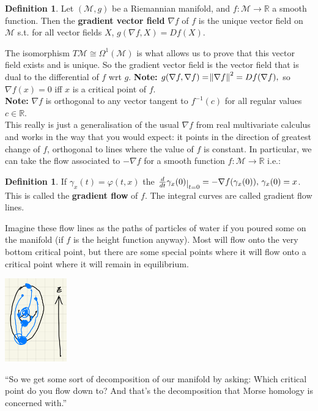 \documentclass[10pt]{article}
\theoremstyle{plain}
\theoremstyle{definition}
\newtheorem{defn}[thm]{Definition} %
\newcommand{\Note}{\textbf{Note: }}
\newcommand{\Real}{\mathbb{R}}
\newcommand{\man}{\mathcal{M}}
\newcommand{\tangbundle}{T\man}
\newcommand{\deriv}{d}
\newcommand{\dt}{\deriv t}
\def\restrict#1{\raise-.5ex\hbox{\ensuremath|}_{#1}}
\begin{document}
\begin{defn}
    Let $(\man,g)$ be a Riemannian manifold, and $f:\man\to\Real$ a smooth function. Then the \textbf{gradient vector field} $\nabla f$ of $f$ is the unique vector field on $\man$ s.t. for all vector fields $X$, $g(\nabla f, X) = Df(X)$.
\end{defn}
The isomorphism $\tangbundle \cong \Omega^1(\man)$ is what allows us to prove that this vector field exists and is unique. So the gradient vector field is the vector field that is dual to the differential of $f$ wrt $g$.
\Note $g(\nabla f,\nabla f) = \norm{\nabla f}^2 = Df(\nabla f),$ so $\nabla f(x) = 0 $ iff $x$ is a critical point of $f$.\\
\Note $\nabla f$ is orthogonal to any vector tangent to $f^{-1}(c)$ for all regular values $c\in\Real.$\\
This really is just a generalisation of the usual $\nabla f$ from real multivariate calculus and works in the way that you would expect: it points in the direction of greatest change of $f$, orthogonal to lines where the value of $f$ is constant. In particular, we can take the flow associated to $-\nabla f$ for a smooth function $f:\man \to \Real $ i.e.: 
\begin{defn}
    If $\gamma_x(t) = \varphi(t,x)$ the $\frac{\deriv}{\dt} \gamma_x(0)\restrict{t=0} = -\nabla f(\gamma_x(0)), \, \gamma_x(0) = x$. This is called the \textbf{gradient flow} of $f$. The integral curves are called gradient flow lines.
\end{defn}
Imagine these flow lines as the paths of particles of water if you poured some on the manifold (if $f$ is the height function anyway). Most will flow onto the very bottom critical point, but there are some special points where it will flow onto a critical point where it will remain in equilibrium.
\begin{center}
    \includegraphics[width = 0.20\textwidth]{WaterGradientFlowLines.png}
\end{center}
``So we get some sort of decomposition of our manifold by asking: Which critical point do you flow down to? And that's the decomposition that Morse homology is concerned with.''
\end{document}
